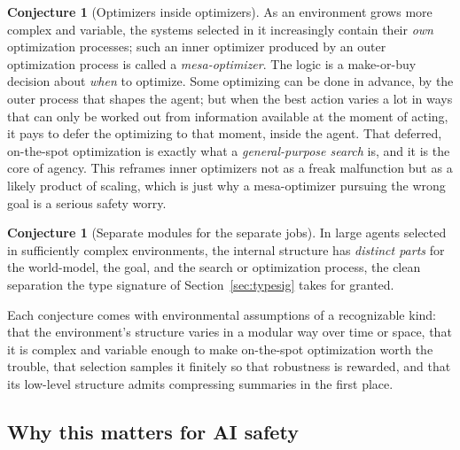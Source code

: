 \documentclass[10pt]{article}
\theoremstyle{definition}
\newtheorem{conjecture}[theorem]{Conjecture}
\theoremstyle{remark}
\begin{document}
\begin{conjecture}[Optimizers inside optimizers]
As an environment grows more complex and variable, the systems selected in it increasingly contain their \emph{own} optimization processes; such an inner optimizer produced by an outer optimization process is called a \emph{mesa-optimizer}. The logic is a make-or-buy decision about \emph{when} to optimize. Some optimizing can be done in advance, by the outer process that shapes the agent; but when the best action varies a lot in ways that can only be worked out from information available at the moment of acting, it pays to defer the optimizing to that moment, inside the agent. That deferred, on-the-spot optimization is exactly what a \emph{general-purpose search} is, and it is the core of agency. This reframes inner optimizers not as a freak malfunction but as a likely product of scaling, which is just why a mesa-optimizer pursuing the wrong goal is a serious safety worry.
\end{conjecture}

\begin{conjecture}[Separate modules for the separate jobs]
In large agents selected in sufficiently complex environments, the internal structure has \emph{distinct parts} for the world-model, the goal, and the search or optimization process, the clean separation the type signature of Section~\ref{sec:typesig} takes for granted.
\end{conjecture}

Each conjecture comes with environmental assumptions of a recognizable kind: that the environment's structure varies in a modular way over time or space, that it is complex and variable enough to make on-the-spot optimization worth the trouble, that selection samples it finitely so that robustness is rewarded, and that its low-level structure admits compressing summaries in the first place.

\subsection{Why this matters for AI safety}
\end{document}
